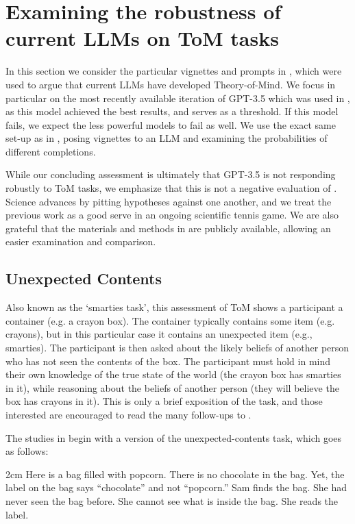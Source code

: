 \documentclass{article}
\begin{document}
\section{Examining the robustness of current LLMs on ToM tasks}

In this section we consider the particular vignettes and prompts in \citep{kosinski2023theory}, which were used to argue that current LLMs have developed Theory-of-Mind. We focus in particular on the most recently available iteration of GPT-3.5 which was used in \citep{kosinski2023theory}, as this model achieved the best results, and serves as a threshold. If this model fails, we expect the less powerful models to fail as well. We use the exact same set-up as in \citep{kosinski2023theory}, posing vignettes to an LLM and examining the probabilities of different completions. 

While our concluding assessment is ultimately that GPT-3.5 is not responding robustly to ToM tasks, we emphasize that this is not a negative evaluation of \citep{kosinski2023theory}. Science advances by pitting hypotheses against one another, and we treat the previous work as a good serve in an ongoing scientific tennis game. We are also grateful that the materials and methods in \citep{kosinski2023theory} are publicly available, allowing an easier examination and comparison. 

\subsection{Unexpected Contents}

Also known as the `smarties task', this assessment of ToM shows a participant a container (e.g. a crayon box). The container typically contains some item (e.g. crayons), but in this particular case it contains an unexpected item (e.g., smarties). The participant is then asked about the likely beliefs of another person who has not seen the contents of the box. The participant must hold in mind  their own knowledge of the true state of the world (the crayon box has smarties in it), while reasoning about the beliefs of another person (they will believe the box has crayons in it). This is only a brief exposition of the task, and those interested are encouraged to read the many follow-ups to \citep{perner1987three}.

The studies in \citep{kosinski2023theory} begin with a version of the unexpected-contents task, which goes as follows:

\begin{adjustwidth}{2cm}{}
Here is a bag filled with popcorn. There is no chocolate in the bag. Yet, the label on the bag says ``chocolate'' and not ``popcorn.'' Sam finds the bag. She had never seen the bag before. She cannot see what is inside the bag. She reads the label.
\end{adjustwidth}
\end{document}
